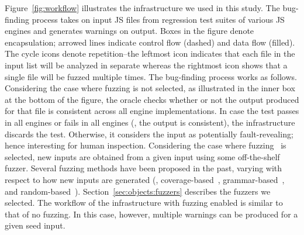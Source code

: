 \documentclass[10pt,conference,anonymous]{IEEEtran}
\begin{document}
Figure~\ref{fig:workflow} illustrates the infrastructure we used in
this study.
The bug-finding process
takes on input JS files from regression test suites of various JS
engines and generates warnings on output. Boxes in the figure denote encapsulation;
arrowed lines indicate control flow (dashed) and data flow
(filled). The cycle icons denote repetition--the leftmost icon
indicates that each file in the input list will be analyzed in
separate whereas the rightmost icon shows that a single file will be
fuzzed multiple times. The bug-finding process works as follows.  Considering the case
where fuzzing is not selected, as illustrated in the inner box at the bottom
of the figure, the oracle checks whether or not the output produced
for that file is consistent across all engine implementations. In case
the test passes in all engines or fails in all engines (\ie{}, the
output is consistent), the infrastructure discards the test. Otherwise, it considers the input as potentially
fault-revealing; hence interesting for human inspection. Considering
the case where fuzzing~\cite{fuzz-testing-history} is selected, new
inputs are obtained from a given input using some off-the-shelf
fuzzer. Several fuzzing methods have been proposed in the
  past, varying with respect to how new inputs are generated (\eg{},
  coverage-based~\cite{afl,honggfuzz},
  grammar-based~\cite{grammarinator,jsfunfuzz}, and
  random-based~\cite{radamsa}). Section~\ref{sec:objects:fuzzers} describes the
  fuzzers we selected. The workflow of the infrastructure with fuzzing
  enabled is similar to that of no fuzzing. In this case, however, multiple warnings can be produced
for a given seed input.
\end{document}
